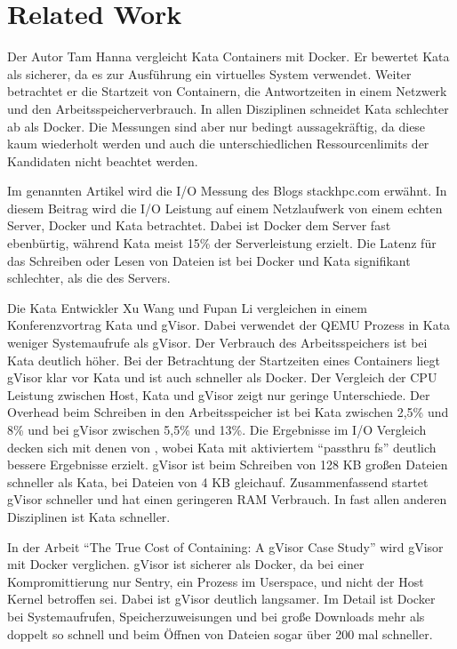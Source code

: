 \section{Related Work}
\label{sec:relatedwork}

Der Autor Tam Hanna vergleicht Kata Containers mit Docker. Er bewertet Kata als sicherer, da es zur Ausführung ein virtuelles System verwendet. Weiter betrachtet er die Startzeit von Containern, die Antwortzeiten in einem Netzwerk und den Arbeitsspeicherverbrauch. In allen Disziplinen schneidet Kata schlechter ab als Docker. Die Messungen sind aber nur bedingt aussagekräftig, da diese kaum wiederholt werden und auch die unterschiedlichen Ressourcenlimits der Kandidaten nicht beachtet werden. \cite[vgl.][]{TamHanna.01.11.2019}

Im genannten Artikel wird die I/O Messung des Blogs stackhpc.com erwähnt. In diesem Beitrag wird die I/O Leistung auf einem Netzlaufwerk von einem echten Server, Docker und Kata betrachtet. Dabei ist Docker dem Server fast ebenbürtig, während Kata meist 15\% der Serverleistung erzielt. Die Latenz für das Schreiben oder Lesen von Dateien ist bei Docker und Kata signifikant schlechter, als die des Servers. \cite[vgl.][]{BharatKunwar.09.05.2019}

Die Kata Entwickler Xu Wang und Fupan Li vergleichen in einem Konferenzvortrag Kata und gVisor. Dabei verwendet der \ac{QEMU} Prozess in Kata weniger Systemaufrufe als gVisor. Der Verbrauch des Arbeitsspeichers ist bei Kata deutlich höher. Bei der Betrachtung der Startzeiten eines Containers liegt gVisor klar vor Kata und ist auch schneller als Docker. Der Vergleich der CPU Leistung zwischen Host, Kata und gVisor zeigt nur geringe Unterschiede. Der Overhead beim Schreiben in den Arbeitsspeicher ist bei Kata zwischen 2,5\% und 8\% und bei gVisor zwischen 5,5\% und 13\%. Die Ergebnisse im I/O Vergleich decken sich mit denen von \cite{BharatKunwar.09.05.2019}, wobei Kata mit aktiviertem "`passthru fs"' deutlich bessere Ergebnisse erzielt. gVisor ist beim Schreiben von 128 KB großen Dateien schneller als Kata, bei Dateien von 4 KB gleichauf. Zusammenfassend startet gVisor schneller und hat einen geringeren RAM Verbrauch. In fast allen anderen Disziplinen ist Kata schneller. \cite[vgl.][]{XuWang.2018}

In der Arbeit "`The True Cost of Containing: A gVisor Case Study"' wird gVisor mit Docker verglichen. gVisor ist sicherer als Docker, da bei einer Kompromittierung nur Sentry, ein Prozess im Userspace, und nicht der Host Kernel betroffen sei. Dabei ist gVisor deutlich langsamer. Im Detail ist Docker bei Systemaufrufen, Speicherzuweisungen und bei große Downloads mehr als doppelt so schnell und beim Öffnen von Dateien sogar über 200 mal schneller. \cite[vgl.][]{EthanG.Young.2019}

